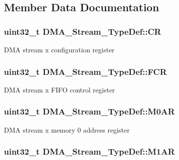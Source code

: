 \subsection{Member Data Documentation}
\hypertarget{struct_d_m_a___stream___type_def_af893adc5e821b15d813237b2bfe4378b}{
\subsubsection[{C\-R}]{ uint32\-\_\-t D\-M\-A\-\_\-\-Stream\-\_\-\-Type\-Def\-::\-C\-R}}\label{struct_d_m_a___stream___type_def_af893adc5e821b15d813237b2bfe4378b}
D\-M\-A stream x configuration register \hypertarget{struct_d_m_a___stream___type_def_aad3d78ab35e7af48951be5be53392f9f}{
\subsubsection[{F\-C\-R}]{ uint32\-\_\-t D\-M\-A\-\_\-\-Stream\-\_\-\-Type\-Def\-::\-F\-C\-R}}\label{struct_d_m_a___stream___type_def_aad3d78ab35e7af48951be5be53392f9f}
D\-M\-A stream x F\-I\-F\-O control register \hypertarget{struct_d_m_a___stream___type_def_a965da718db7d0303bff185d367d96fd6}{
\subsubsection[{M0\-A\-R}]{ uint32\-\_\-t D\-M\-A\-\_\-\-Stream\-\_\-\-Type\-Def\-::\-M0\-A\-R}}\label{struct_d_m_a___stream___type_def_a965da718db7d0303bff185d367d96fd6}
D\-M\-A stream x memory 0 address register \hypertarget{struct_d_m_a___stream___type_def_a142ca5a1145ba9cf4cfa557655af1c13}{
\subsubsection[{M1\-A\-R}]{ uint32\-\_\-t D\-M\-A\-\_\-\-Stream\-\_\-\-Type\-Def\-::\-M1\-A\-R}}\label{struct_d_m_a___stream___type_def_a142ca5a1145ba9cf4cfa557655af1c13}
